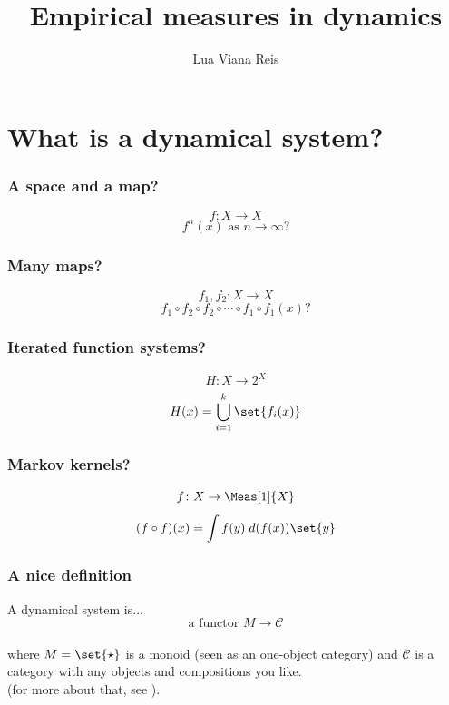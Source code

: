 \documentclass[shortlabels, 9pt, aspectratio=2013]{beamer}
\title{Empirical measures in dynamics}
\author{Lua Viana Reis}
\begin{document}
\begin{frame}
    \maketitle
\end{frame}

\section{What is a dynamical system?}
\begin{frame}
  \frametitle{A space and a map?}
  \[f \colon X \to X\]
  \[f^n(x)\text{ as }n \to \infty?\]
\end{frame}

\begin{frame}
  \frametitle{Many maps?}
  \[f_1,f_2 \colon X \to X\]
  \[f_1 \circ f_2 \circ f_2 \circ \cdots \circ f_1 \circ f_1 (x)?\]
\end{frame}

\begin{frame}
  \frametitle{Iterated function systems?}
  \[H \colon X \to 2^X\]
  \[H(x) = \bigcup_{i = 1}^k \set{f_i(x)}\]
\end{frame}

\begin{frame}
  \frametitle{Markov kernels?}
  \[f \colon X \to \Meas[1]{X}\]
  \[(f \circ f)(x) = \int f(y) \;d(f(x))\set{y}\]
\end{frame}

\begin{frame}
  \frametitle{A nice definition}
  A dynamical system is...\\[2em]
  \[\text{a functor } M \to \mathcal{C}\]\\[2em]
  
  where \(M = \set{\star}\) is a monoid (seen as an one-object category) and \(\mathcal{C}\) is a category with any objects and compositions you like.\\[3em]

  (for more about that, see \Textcite{mossCategorytheoreticProofErgodic2023}).
\end{frame}
\end{document}
